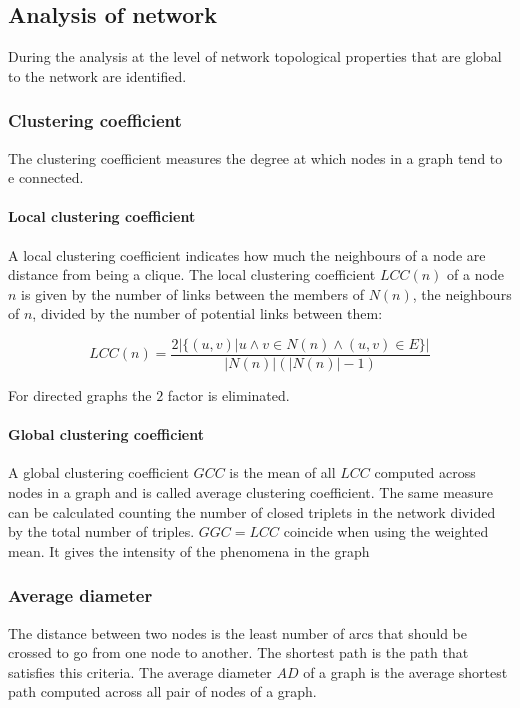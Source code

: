 	\subsection{Analysis of network}
	During the analysis at the level of network topological properties that are global to the network are identified.

		\subsubsection{Clustering coefficient}
		The clustering coefficient measures the degree at which nodes in a graph tend to e connected.

			\paragraph{Local clustering coefficient}
			A local clustering coefficient indicates how much the neighbours of a node are distance from being a clique.
			The local clustering coefficient $LCC(n)$ of a node $n$ is given by the number of links between the members of $N(n)$, the neighbours of $n$, divided by the number of potential links between them:

			$$LCC(n) = \frac{2|\{(u,v)|u\land v\in N(n)\land (u,v)\in E\}|}{|N(n)|(|N(n)|-1)}$$

			For directed graphs the $2$ factor is eliminated.

			\paragraph{Global clustering coefficient}
			A global clustering coefficient $GCC$ is the mean of all $LCC$ computed across nodes in a graph and is called average clustering coefficient.
			The same measure can be calculated counting the number of closed triplets in the network divided by the total number of triples.
			$GGC=LCC$ coincide when using the weighted mean.
			It gives the intensity of the phenomena in the graph

		\subsubsection{Average diameter}
		The distance between two nodes is the least number of arcs that should be crossed to go from one node to another.
		The shortest path is the path that satisfies this criteria.
		The average diameter $AD$ of a graph is the average shortest path computed across all pair of nodes of a graph.

